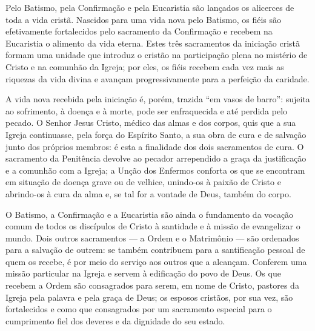 Pelo Batismo, pela Confirmação e pela Eucaristia são lançados os alicerces de toda a vida cristã. Nascidos para uma vida nova pelo Batismo, os fiéis são efetivamente fortalecidos pelo sacramento da Confirmação e recebem na Eucaristia o alimento da vida eterna. Estes três sacramentos da iniciação cristã formam uma unidade que introduz o cristão na participação plena no mistério de Cristo e na comunhão da Igreja; por eles, os fiéis recebem cada vez mais as riquezas da vida divina e avançam progressivamente para a perfeição da caridade.

A vida nova recebida pela iniciação é, porém, trazida ``em vasos de barro'': sujeita ao sofrimento, à doença e à morte, pode ser enfraquecida e até perdida pelo pecado. O Senhor Jesus Cristo, médico das almas e dos corpos, quis que a sua Igreja continuasse, pela força do Espírito Santo, a sua obra de cura e de salvação junto dos próprios membros: é esta a finalidade dos dois sacramentos de cura. O sacramento da Penitência devolve ao pecador arrependido a graça da justificação e a comunhão com a Igreja; a Unção dos Enfermos conforta os que se encontram em situação de doença grave ou de velhice, unindo-os à paixão de Cristo e abrindo-os à cura da alma e, se tal for a vontade de Deus, também do corpo.

O Batismo, a Confirmação e a Eucaristia são ainda o fundamento da vocação comum de todos os discípulos de Cristo à santidade e à missão de evangelizar o mundo. Dois outros sacramentos --- a Ordem e o Matrimônio --- são ordenados para a salvação de outrem: se também contribuem para a santificação pessoal de quem os recebe, é por meio do serviço aos outros que a alcançam. Conferem uma missão particular na Igreja e servem à edificação do povo de Deus. Os que recebem a Ordem são consagrados para serem, em nome de Cristo, pastores da Igreja pela palavra e pela graça de Deus; os esposos cristãos, por sua vez, são fortalecidos e como que consagrados por um sacramento especial para o cumprimento fiel dos deveres e da dignidade do seu estado.